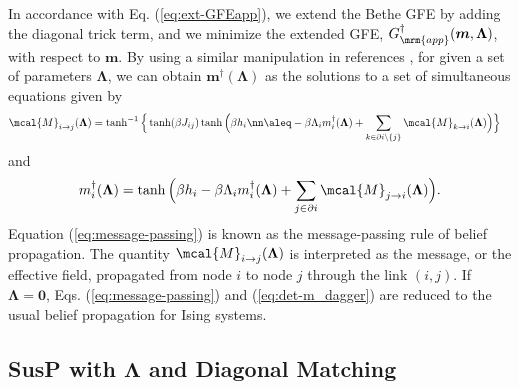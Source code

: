 \documentclass[%
 reprint,
 amsmath,amssymb,
 aps, 
 pre,
 showkeys
]{revtex4-1}
\begin{document}
In accordance with Eq. (\ref{eq:ext-GFEapp}), we extend the Bethe GFE by adding the diagonal trick term, and we minimize the extended GFE, 
$G_{\mrm{app}}^{\dagger}(\bm{m}, \bm{\Lambda})$, with respect to $\bm{m}$. 
By using a similar manipulation in references \cite{Horiguchi1981, Yasuda&Tanaka2009}, for given a set of parameters $\bm{\Lambda}$, 
we can obtain $\bm{m}^{\dagger}(\bm{\Lambda})$ as the solutions to a set of simultaneous equations given by
\begin{align}
\mcal{M}_{i\rightarrow j}(\bm{\Lambda})&=\tanh^{-1}\Big\{ \tanh( \beta J_{ij}) 
\tanh\Big( \beta h_i \nn
\aleq- \beta \Lambda_i m_i^{\dagger}(\bm{\Lambda}) + \sum_{k \in \partial i \setminus \{j\}} \mcal{M}_{k\rightarrow i}(\bm{\Lambda})\Big)\Big\}
\label{eq:message-passing}
\end{align}
and
\begin{align}
m_i^{\dagger}(\bm{\Lambda})=\tanh\Big(\beta h_i- \beta \Lambda_i m_i^{\dagger}(\bm{\Lambda}) + \sum_{j \in \partial i } \mcal{M}_{j\rightarrow i}(\bm{\Lambda})\Big).
\label{eq:det-m_dagger}
\end{align}
Equation (\ref{eq:message-passing}) is known as the message-passing rule of belief propagation. 
The quantity $\mcal{M}_{i\rightarrow j}(\bm{\Lambda})$ is interpreted as the message, or the effective field, propagated from node $i$ to node $j$ through the link $(i,j)$. 
If $\bm{\Lambda}=\bm{0}$, Eqs. (\ref{eq:message-passing}) and (\ref{eq:det-m_dagger}) are reduced to the usual belief propagation for Ising systems.

\subsection{SusP with $\bm{\Lambda}$ and Diagonal Matching}
\end{document}
